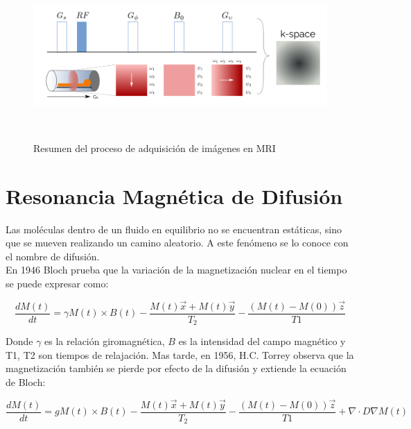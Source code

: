 \begin{figure}[h!]
                                                                                                                        
\begin{minipage}[b]{\textwidth}
    \includegraphics[width=\textwidth]{img/kspace.png}
    \caption{Resumen del proceso de adquisici\'on de im\'agenes en MRI}
    \label{fig:kspace}
\end{minipage} ~

\end{figure}  



\section{Resonancia Magn\'etica de Difusi\'on}

Las mol\'eculas dentro de un fluido en equilibrio no se encuentran est\'aticas,
sino que se mueven realizando un camino aleatorio. A este fen\'omeno se lo 
conoce con el nombre de difusi\'on.  \\

En 1946 Bloch \cite{Bloch1946} prueba que la variaci\'on de la magnetizaci\'on
nuclear en el tiempo se puede expresar como:

$$ \frac{dM(t)}{dt} = \gamma M(t) \times B(t) 
                      - \frac{M(t) \vec{x} + M(t)\vec{y}}{T_2}
                      - \frac{(M(t)-M(0))\vec{z}}{T1} $$

Donde $\gamma$ es la relaci\'on giromagn\'etica, $B$ es la intensidad del campo
magn\'etico y T1, T2 son tiempos de relajaci\'on. Mas tarde, en 1956, H.C. Torrey \cite{Torrey1956}
observa que la magnetizaci\'on tambi\'en se pierde por efecto de la difusi\'on y 
extiende la ecuaci\'on de Bloch:

$$ \frac{dM(t)}{dt} = g M(t) \times B(t) 
                      - \frac{M(t) \vec{x} + M(t)\vec{y}}{T_2}
                      - \frac{(M(t)-M(0))\vec{z}}{T1} 
                      + \nabla \cdot D \nabla M(t) $$

